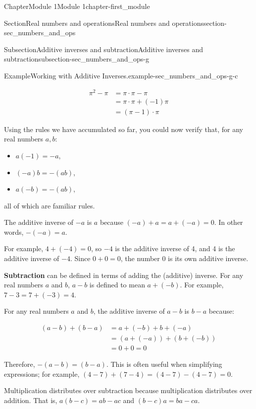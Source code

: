 \documentclass[oneside,10pt,]{book}
\newcommand{\terminology}[1]{\textbf{#1}}
\begin{document}
\begin{chapterptx}{Chapter}{Module 1}{}{Module 1}{}{}{chapter-first_module}
\begin{sectionptx}{Section}{Real numbers and operations}{}{Real numbers and operations}{}{}{section-sec_numbers_and_ops}
\begin{subsectionptx}{Subsection}{Additive inverses and subtraction}{}{Additive inverses and subtraction}{}{}{subsection-sec_numbers_and_ops-g}
\begin{example}{Example}{Working with Additive Inverses.}{example-sec_numbers_and_ops-g-c}
\par
%
\begin{equation*}
\begin{aligned}
\pi^2-\pi&=\pi\cdot\pi-\pi \\
&=\pi\cdot\pi+(-1)\pi \\
&=(\pi-1)\cdot\pi
\end{aligned}
\end{equation*}
%
\end{example}
Using the rules we have accumulated so far, you could now verify that, for any real numbers \(a,b\):%
\par
%
\begin{itemize}[label=\textbullet]
\item{}\(a(-1) = -a\),%
\item{}\((-a)b = -(ab)\),%
\item{}\(a(-b) = -(ab)\),%
\end{itemize}
%
\par
all of which are familiar rules.%
\par
The additive inverse of \(-a\) is \(a\) because \((-a) + a = a + (-a) = 0\).  In other words, \(-(-a) = a\).%
\par
For example, \(4 + (-4) = 0\), so \(-4\) is the additive inverse of 4, and 4 is the additive inverse of \(-4\).  Since \(0 + 0 = 0\), the number 0 is its own additive inverse.%
\par
{}\terminology{Subtraction} can be defined in terms of adding the (additive) inverse.  For any real numbers \(a\) and \(b\), \(a - b\) is defined to mean \(a + (-b)\).  For example, \(7 - 3 = 7 + (-3) = 4\).%
\par
For any real numbers \(a\) and \(b\), the additive inverse of \(a-b\) is \(b-a\) because:%
\par
%
\begin{equation*}
\begin{aligned}
(a - b) + (b - a) &= a + (-b) + b + (-a) \\
&= (a + (-a)) + (b + (-b)) \\
&=0 + 0 = 0
\end{aligned}
\end{equation*}
%
\par
Therefore, \(-(a - b) = (b-a)\).  This is often useful when simplifying expressions; for example, \((4-7)+(7-4)=(4-7)-(4-7)=0\).%
\par
Multiplication distributes over subtraction because multiplication distributes over addition.  That is, \(a (b - c) = ab - ac\) and \((b - c) a = ba - ca\).%

\end{subsectionptx}
\end{sectionptx}
\end{chapterptx}
\end{document}
